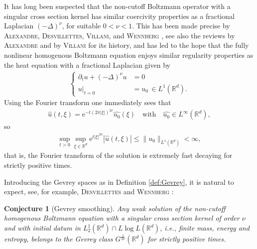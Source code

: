 \documentclass[11pt,a4paper,reqno]{amsart}
\theoremstyle{plain}
\newtheorem*{conjecture*}{Conjecture}
\theoremstyle{definition}
\begin{document}
   It has long been suspected that the non-cutoff Boltzmann operator with a singular cross section kernel has similar coercivity properties as a fractional Laplacian $(-\Delta)^\nu$, for suitable $0<\nu<1$. This has been made precise by \textsc{Alexandre, Desvillettes, Villani}, and \textsc{Wennberg} \cite{ADVW00}, see also the reviews by \textsc{Alexandre} \cite{Ale09} and by \textsc{Villani} \cite{Vil02} for its history, and has led to the hope that the fully nonlinear  homogenous Boltzmann equation enjoys similar regularity properties as the heat equation with a fractional Laplacian given by
		\begin{align*}
			\left\{\begin{array}{rl}
					\partial_t u + (-\Delta)^{\nu}u &= 0 \\
					\left.u\right|_{t=0} &= u_0 \,\in L^1({\mathbb{R}}^d) .
			\end{array}	\right.
		\end{align*}
 Using the Fourier transform one immediately sees that
	\begin{align*}
	\widehat{u}(t,\xi) = \mathrm{e}^{-t (2\pi |\xi|)^{2\nu}} \widehat{u_0}(\xi) \quad \text{with}  \quad \widehat{u_0} \in L^{\infty}({\mathbb{R}}^d),
	\end{align*}
	 so
	\begin{align*}
		\sup_{t>0} \sup_{\xi\in{\mathbb{R}}^d} \mathrm{e}^{t |\xi|^{2\nu}}|\widehat{u}(t,\xi)| \leq \|u_0\|_{L^1({\mathbb{R}}^d)} <\infty,
	\end{align*}
	that is, the Fourier transform of the solution is extremely fast decaying for strictly positive times.

  Introducing the Gevrey spaces as in Definition \ref{def:Gevrey}, it is natural to expect,   see, for example, \textsc{Desvillettes} and \textsc{Wennberg} \cite{DW10}:
   \begin{conjecture*}[Gevrey smoothing]
    Any weak	 solution of the non-cutoff homogenous Boltzmann equation with a singular cross section kernel of order $\nu$ and with initial datum in $L^1_2(\mathbb{R}^d)\cap L\log L(\mathbb{R}^d)$, i.e., finite mass, energy and entropy, belongs to the Gevrey class $G^{\frac{1}{2\nu}}({\mathbb{R}}^d)$ for strictly positive times.
   \end{conjecture*}
\end{document}
